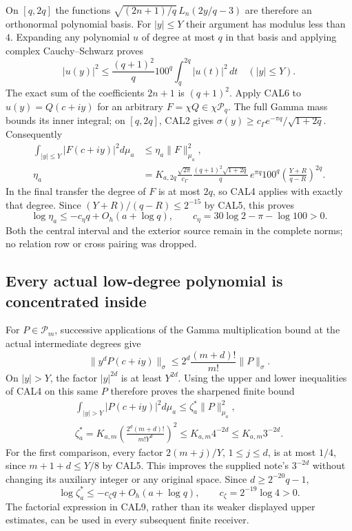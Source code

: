 On $[q,2q]$ the functions
$\sqrt{(2n+1)/q}\,L_n(2y/q-3)$ are therefore an orthonormal
polynomial basis. For $|y|\le Y$ their argument has modulus less
than $4$. Expanding any polynomial $u$ of degree at most $q$ in
that basis and applying complex Cauchy--Schwarz proves
\[
 |u(y)|^2\le\frac{(q+1)^2}{q}100^q
                        \int_q^{2q}|u(t)|^2\,dt\quad(|y|\le Y).
 \tag{CAL6}
\]
The exact sum of the coefficients $2n+1$ is $(q+1)^2$.
Apply CAL6 to $u(y)=Q(c+iy)$ for an arbitrary
$F=\chi Q\in\chi\mathcal P_q$. The full Gamma mass bounds its
inner integral; on $[q,2q]$, CAL2 gives
$\sigma(y)\ge c_\Gamma e^{-\pi q}/\sqrt{1+2q}$.
Consequently
\[
 \begin{split}
 \int_{|y|\le Y}|F(c+iy)|^2d\mu_a
       &\le\eta_a\|F\|_{\mu_a}^2,\\
 \eta_a&=K_{a,2q}\frac{\sqrt{2\pi}}{c_\Gamma}
      \frac{(q+1)^2\sqrt{1+2q}}q\,
       e^{\pi q}100^q
       \left(\frac{Y+R}{q-R}\right)^{2q}.
 \end{split}                                                     \tag{CAL7}
\]
In the final transfer the degree of $F$ is at most $2q$, so
CAL4 applies with exactly that degree. Since
$(Y+R)/(q-R)\le2^{-15}$ by CAL5, this proves
\[
 \log\eta_a\le
  -c_\eta q+O_h(a+\log q),\qquad
 c_\eta=30\log2-\pi-\log100>0.
 \tag{CAL8}
\]
Both the central interval and the exterior source remain in the
complete norms; no relation row or cross pairing was dropped.

\subsection{Every actual low-degree polynomial is concentrated inside}

For $P\in\mathcal P_m$, successive applications of the Gamma
multiplication bound at the actual intermediate degrees give
\[
 \|y^d P(c+iy)\|_\sigma
 \le 2^d\frac{(m+d)!}{m!}\|P\|_\sigma.
\]
On $|y|>Y$, the factor $|y|^{2d}$ is at least $Y^{2d}$.
Using the upper and lower inequalities of CAL4 on this same
$P$ therefore proves the sharpened finite bound
\[
 \begin{gathered}
 \int_{|y|>Y}|P(c+iy)|^2d\mu_a\le\zeta_a^*\|P\|_{\mu_a}^2,\\
 \zeta_a^*=K_{a,m}
       \left(\frac{2^d(m+d)!}{m!Y^d}\right)^2
       \le K_{a,m}4^{-2d}\le K_{a,m}3^{-2d}.
 \end{gathered}                                                   \tag{CAL9}
\]
For the first comparison, every factor
$2(m+j)/Y$, $1\le j\le d$, is at most $1/4$, since
$m+1+d\le Y/8$ by CAL5. This improves the supplied note's
$3^{-2d}$ without changing its auxiliary integer or any original
space. Since $d\ge2^{-20}q-1$,
\[
 \log\zeta_a^*\le
       -c_\zeta q+O_h(a+\log q),\qquad
 c_\zeta=2^{-19}\log4>0.
 \tag{CAL10}
\]
The factorial expression in CAL9, rather than its weaker displayed
upper estimates, can be used in every subsequent finite receiver.


